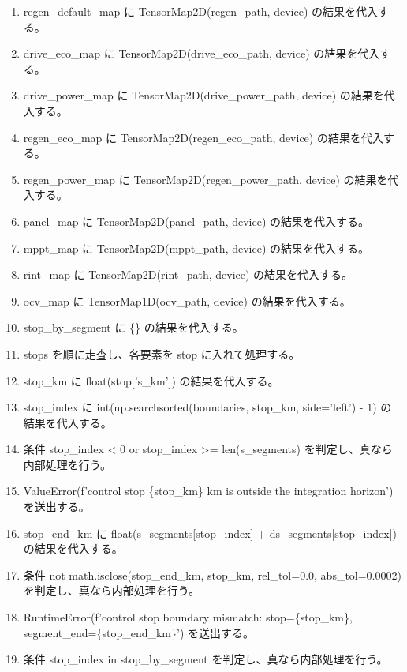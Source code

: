 \documentclass[a4paper,11pt]{article}
\begin{document}
\begin{enumerate}[leftmargin=1.8em]
\item regen\_default\_map に TensorMap2D(regen\_path, device) の結果を代入する。
\item drive\_eco\_map に TensorMap2D(drive\_eco\_path, device) の結果を代入する。
\item drive\_power\_map に TensorMap2D(drive\_power\_path, device) の結果を代入する。
\item regen\_eco\_map に TensorMap2D(regen\_eco\_path, device) の結果を代入する。
\item regen\_power\_map に TensorMap2D(regen\_power\_path, device) の結果を代入する。
\item panel\_map に TensorMap2D(panel\_path, device) の結果を代入する。
\item mppt\_map に TensorMap2D(mppt\_path, device) の結果を代入する。
\item rint\_map に TensorMap2D(rint\_path, device) の結果を代入する。
\item ocv\_map に TensorMap1D(ocv\_path, device) の結果を代入する。
\item stop\_by\_segment に \{\} の結果を代入する。
\item stops を順に走査し、各要素を stop に入れて処理する。
\item   stop\_km に float(stop['s\_km']) の結果を代入する。
\item   stop\_index に int(np.searchsorted(boundaries, stop\_km, side='left') - 1) の結果を代入する。
\item   条件 stop\_index < 0 or stop\_index >= len(s\_segments) を判定し、真なら内部処理を行う。
\item     ValueError(f'control stop \{stop\_km\} km is outside the integration horizon') を送出する。
\item   stop\_end\_km に float(s\_segments[stop\_index] + ds\_segments[stop\_index]) の結果を代入する。
\item   条件 not math.isclose(stop\_end\_km, stop\_km, rel\_tol=0.0, abs\_tol=0.0002) を判定し、真なら内部処理を行う。
\item     RuntimeError(f'control stop boundary mismatch: stop=\{stop\_km\}, segment\_end=\{stop\_end\_km\}') を送出する。
\item   条件 stop\_index in stop\_by\_segment を判定し、真なら内部処理を行う。
            \end{enumerate}
\end{document}
